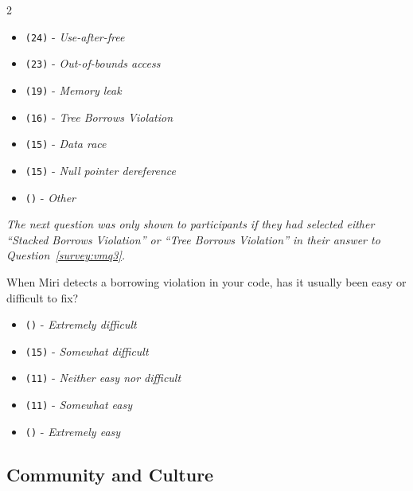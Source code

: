 \begin{protocol}
\begin{multicols}{2}
\begin{itemize}
\item \texttt{(24)} - \textit{Use-after-free}
\item \texttt{(23)} - \textit{Out-of-bounds access}
\item \texttt{(19)} - \textit{Memory leak}
\item \texttt{(16)} - \textit{Tree Borrows Violation}
\item \texttt{(15)} - \textit{Data race}
\item \texttt{(15)} - \textit{Null pointer dereference}
\item \texttt{()} - \textit{Other}
\end{itemize}
\end{multicols}
\end{protocol}

\noindent\textit{The next question was only shown to participants if they had selected either ``\textit{Stacked Borrows Violation}'' or ``\textit{Tree Borrows Violation}'' in their answer to Question~\ref{survey:vmq3}.}
\begin{protocol}
\setcounter{protocoli}{3}
\item \label{survey:vmq4}  When Miri detects a borrowing violation in your code, has it usually been easy or difficult to fix?
\begin{itemize}
\item \texttt{()} - \textit{Extremely difficult}
\item \texttt{(15)} - \textit{Somewhat difficult}
\item \texttt{(11)} - \textit{Neither easy nor difficult}
\item \texttt{(11)} - \textit{Somewhat easy}
\item \texttt{()} - \textit{Extremely easy}
\end{itemize}
\end{protocol}

\subsection{Community and Culture}
\label{survey:sec:ccq}

